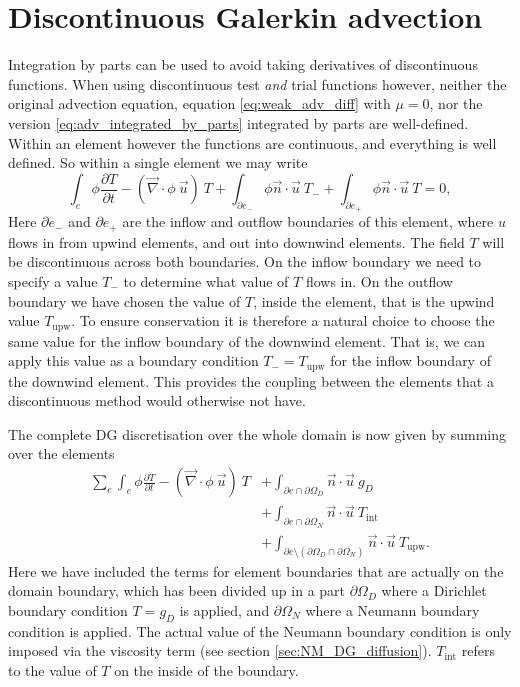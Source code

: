 \section{Discontinuous Galerkin advection}\label{sec:NM_DG_advection}
Integration by parts can be used to avoid taking 
derivatives of discontinuous functions.
When using discontinuous test \emph{and} trial functions however, 
neither the original advection equation, equation \eqref{eq:weak_adv_diff} with $\mu=0$, 
nor the version \eqref{eq:adv_integrated_by_parts} integrated by parts are well-defined. 
Within an element however the functions are continuous, and everything is well defined. So within 
a single element we may write
\begin{equation}\label{eq:adv_integrated_by_parts}
  \int_e \phi \frac{\partial T}{\partial t} -
    \left(\vec{\nabla}\cdot \phi~\vec{u}\right)~T +
    \int_{\partial e_-} \phi\vec{n}\cdot\vec{u}~T_- +
    \int_{\partial e_+} \phi\vec{n}\cdot\vec{u}~T
    = 0,
\end{equation}
Here $\partial e_-$ and $\partial e_+$ are the inflow and outflow boundaries of this element, where
$u$ flows in from upwind elements, and out into downwind elements. The field $T$ will be 
discontinuous across both boundaries. On the inflow boundary we need 
to specify a value $T_-$ to determine what value of $T$ flows in. On the outflow boundary we have 
chosen the value of $T$, inside the element, that is the upwind value $T_{\mathrm{upw}}$.
To ensure conservation it is therefore a natural choice to choose the same value 
for the inflow boundary of the downwind element. That is, we can apply this value as a 
boundary condition $T_-=T_{\mathrm{upw}}$ for the inflow boundary of the downwind 
element. This provides the coupling between the elements that a discontinuous method would otherwise 
not have.

The complete DG discretisation over the whole domain is now given by summing over the elements
\begin{equation}
\begin{split}
  \sum_e \int_e \phi \frac{\partial T}{\partial t}
    - \left(\vec{\nabla}\cdot \phi~\vec{u}\right)~T 
    &+ \int_{\partial e \cap\partial\Omega_D} \vec{n}\cdot\vec{u}~g_D \\
    &+ \int_{\partial e \cap\partial\Omega_N} \vec{n}\cdot\vec{u}~T_{\mathrm{int}} \\
    &+ \int_{\partial e\setminus (\partial\Omega_D\cap\partial\Omega_N)} \vec{n}\cdot\vec{u}~T_{\mathrm{upw}}.
      \label{eq:dg_adv_diff_integrated_once}
\end{split}
\end{equation}
Here we have included the terms for element boundaries that are actually on
the domain boundary, which has been divided up in a part $\partial\Omega_D$
where a Dirichlet boundary condition $T=g_D$ is applied, and
$\partial\Omega_N$ where a Neumann boundary condition is applied. The actual value of
the Neumann boundary condition is only imposed via the viscosity term (see
section \ref{sec:NM_DG_diffusion}). $T_{\mathrm{int}}$ refers to the value of
$T$ on the inside of the boundary.

